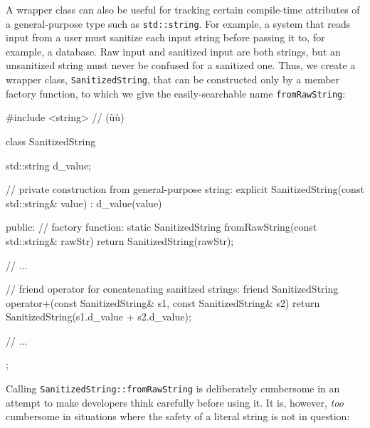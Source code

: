 \noindent A wrapper class can also be useful for tracking certain compile-time
attributes of a general-purpose type such as \lstinline!std::string!. For
example, a system that reads input from a user must sanitize each input
string before passing it to, for example, a database. Raw input and
sanitized input are both strings, but an unsanitized string must never
be confused for a sanitized one. Thus, we create a wrapper class,
\lstinline!SanitizedString!, that can be constructed only by a member
factory function, to which we give the easily-searchable name
\lstinline!fromRawString!:

\begin{emcppslisting}
#include <string>  // (ù{}ù)

class SanitizedString
{
    std::string d_value;

    // private construction from general-purpose string:
    explicit SanitizedString(const std::string& value) : d_value(value) { }

public:
    // factory function:
    static SanitizedString fromRawString(const std::string& rawStr)
    {
        return SanitizedString(rawStr);
    }

    // ...

    // friend operator for concatenating sanitized strings:
    friend SanitizedString operator+(const SanitizedString& s1,
                                     const SanitizedString& s2)
    {
        return SanitizedString(s1.d_value + s2.d_value);
    }

    // ...
};
\end{emcppslisting}
    
\noindent Calling \lstinline!SanitizedString::fromRawString! is deliberately
cumbersome in an attempt to make developers think carefully before using
it. It is, however, \emph{too} cumbersome in situations where the safety
of a literal string is not in question:

